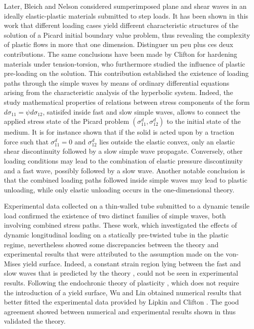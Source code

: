Later, Bleich and Nelson \cite{Bleich} considered sumperimposed plane and shear waves in an ideally elastic-plastic materials submitted to step loads.
It has been shown in this work that different loading cases yield different characteristic structures of the solution of a Picard initial boundary value problem, thus revealing the complexity of plastic flows in more that one dimension.
Distinguer un peu plus ces deux contributions.
The same conclusions have been made by Clifton \cite{Clifton} for hardening materials under tension-torsion, who furthermore studied the influence of plastic pre-loading on the solution.
This contribution established the existence of loading paths through the simple waves by means of ordinary differential equations arising from the characteristic analysis of the hyperbolic system.
Indeed, the study mathematical properties of relations between stress components of the form $d\sigma_{11}=\psi d\sigma_{12}$, satisifed inside fast and slow simple waves, allows to connect the applied stress state of the Picard problem $(\sigma^d_{11},\sigma^d_{12})$ to the initial state of the medium.
It is for instance shown that if the solid is acted upon by a traction force such that $\sigma^d_{11}=0$ and $\sigma^d_{12}$ lies outside the elastic convex, only an elastic shear discontinuity followed by a slow simple wave propagate.
Conversely, other loading conditions may lead to the combination of elastic pressure discontinuity and a fast wave, possibly followed by a slow wave.
Another notable conclusion is that the combined loading paths followed inside simple waves may lead to plastic unloading, while only elastic unloading occurs in the one-dimensional theory.

Experimental data collected on a thin-walled tube submitted to a dynamic tensile load \cite{Clifton_exp,Clifton_exp2} confirmed the existence of two distinct families of  simple waves, both involving combined stress paths.
These work, which investigated the effects of dynamic longitudinal loading on a statically pre-twisted tube in the plastic regime, nevertheless showed some discrepancies between the theory and experimental results that were attributed to the assumption made on the von-Mises yield surface.
Indeed, a constant strain region lying between the fast and slow waves that is predicted by the theory \cite{Clifton}, could not be seen in experimental results.
Following the endochronic theory of plasticity \cite{Valanis}, which does not require the introduction of a yield surface, Wu and Lin \cite{Wu_experimental} obtained numerical results that better fitted the experimental data provided by Lipkin and Clifton \cite{Clifton_exp2}.
The good agreement showed between numerical and experimental results shown in \cite{Wu_experimental} thus validated the theory.

